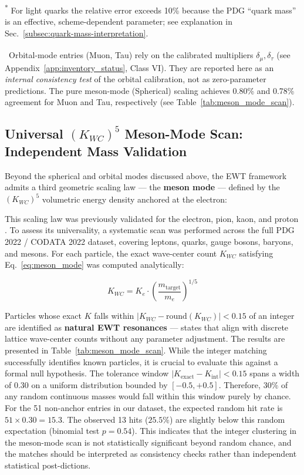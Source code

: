 \documentclass[10pt,a4paper]{article}
\begin{document}
\begin{table}[ht]
	\vspace{4pt}
	\raggedright\footnotesize
	\textsuperscript{*} For light quarks the relative error exceeds 10\% because 
	the PDG ``quark mass'' is an effective, scheme-dependent parameter; see explanation in 
	Sec.~\ref{subsec:quark-mass-interpretation}.
	
	\vspace{2pt}
	\textsuperscript{\dag}~Orbital-mode entries (Muon, Tau) rely on the calibrated 
	multipliers \(\delta_\mu, \delta_\tau\) (see Appendix~\ref{app:inventory_status}, Class VI). 
	They are reported here as an \emph{internal consistency test} of the orbital calibration, 
	not as zero-parameter predictions. The pure meson-mode (Spherical) scaling achieves 
	0.80\% and 0.78\% agreement for Muon and Tau, respectively (see Table~\ref{tab:meson_mode_scan}).
\end{table}

\subsection{Universal $({K_{WC}})^5$ Meson-Mode Scan: Independent Mass Validation}
\label{sec:meson_mode_scan}

Beyond the spherical and orbital modes discussed above, the EWT framework admits a third geometric scaling law --- the \textbf{meson mode} --- defined by the $({K_{WC}})^5$ volumetric energy density anchored at the electron:

This scaling law was previously validated for the electron, pion, kaon, and proton \cite{yee2019geometry}. To assess its universality, a systematic scan was performed across the full PDG 2022 / CODATA 2022 dataset, covering leptons, quarks, gauge bosons, baryons, and mesons. For each particle, the exact wave-center count $K_{WC}$ satisfying Eq.~\eqref{eq:meson_mode} was computed analytically:

\begin{equation}
	K_{WC} = K_e \cdot \left(\frac{m_{\text{target}}}{m_e}\right)^{1/5}
\end{equation}

Particles whose exact $K$ falls within $|K_{WC} - \text{round}(K_{WC})| < 0.15$ of an integer are identified as \textbf{natural EWT resonances} --- states that align with discrete lattice wave-center counts without any parameter adjustment. The results are presented in Table~\ref{tab:meson_mode_scan}. While the integer matching successfully identifies known particles, it is crucial to evaluate this against a formal null hypothesis. The tolerance window \(|K_{\text{exact}} - K_{\text{int}}| < 0.15\) spans a width of \(0.30\) on a uniform distribution bounded by \([-0.5, +0.5]\). Therefore, \(30\%\) of any random continuous masses would fall within this window purely by chance. For the 51 non-anchor entries in our dataset, the expected random hit rate is \(51 \times 0.30 = 15.3\). The observed 13 hits (\(25.5\%\)) are slightly below this random expectation (binomial test \(p=0.54\)). This indicates that the integer clustering in the meson-mode scan is not statistically significant beyond random chance, and the matches should be interpreted as consistency checks rather than independent statistical post-dictions.
\end{document}
